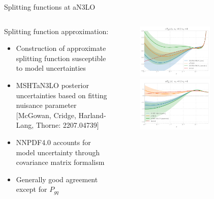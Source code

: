 \documentclass[aspectratio=169, 8pt,t]{beamer}
\begin{document}
\begin{frame}{Splitting functions at aN3LO}
  \begin{columns}[T]
    \begin{column}{0.49\textwidth}
      Splitting function approximation:
      \begin{itemize}
        \item Construction of approximate splitting function susceptible to  model uncertainties
        \item MSHTaN3LO posterior uncertainties based on fitting nuisance parameter [\color{gray}\small McGowan, Cridge, Harland-Lang, Thorne: 2207.04739]
        \item NNPDF4.0 accounts for model uncertainty through covariance matrix formalism
        \item Generally good agreement except for $P_{gq}$
      \end{itemize}
    \end{column}
    \begin{column}{0.49\textwidth}
      \vspace*{-4em}
      \begin{figure}
        \includegraphics[width=0.7\textwidth]{figures/gamma_gg_msht_logx.pdf}\\
        \includegraphics[width=0.7\textwidth]{figures/gamma_gq_msht_logx.pdf}  
      \end{figure}
    \end{column}
  \end{columns}
\end{frame}
\end{document}
